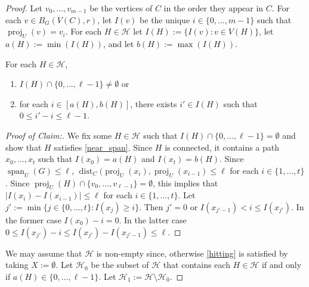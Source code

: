\documentclass{patmorin}
\newenvironment{clmproof}{\begin{proof}[Proof of Claim:]\renewcommand{\qedsymbol}{\rule{1ex}{1ex}}}{\end{proof}}
\DeclareMathOperator{\proj}{proj}
\DeclareMathOperator{\spn}{span}
\DeclareMathOperator{\dist}{dist}
\begin{document}
\begin{proof}
  Let $v_0,\ldots,v_{m-1}$ be the vertices of $C$ in the order they appear in $C$.  For each $v\in B_G(V(C),r)$, let $I(v)$ be the unique $i\in\{0,\ldots,m-1\}$ such that $\proj_U(v)=v_i$.  For each $H\in \mathcal{H}$ let $I(H):=\{I(v):v\in V(H)\}$, let  $a(H):=\min(I(H))$, and let $b(H):=\max(I(H))$.

  \begin{clm}\label{near_claim}
    For each $H\in\mathcal{H}$,
    \begin{enumerate}[nosep,nolistsep,label=\rm(\roman*),ref=\rm(\roman*)]
      \item $I(H)\cap\{0,\ldots,\ell-1\}\neq\emptyset$ or
      \item\label{near_span} for each $i\in [a(H),b(H)]$, there exists $i'\in I(H)$ such that $0\le i'-i\le\ell-1$.
    \end{enumerate}
  \end{clm}

  \begin{clmproof}
    We fix some $H\in\mathcal{H}$ such that $I(H)\cap\{0,\ldots,\ell-1\}=\emptyset$ and show that $H$ satisfies \ref{near_span}.  Since $H$ is connected, it contains a path $x_0,\ldots,x_t$ such that $I(x_0)=a(H)$ and $I(x_{t})=b(H)$. Since $\spn_U(G)\le\ell$, $\dist_C(\proj_U(x_i),\proj_U(x_{i-1})\le\ell$ for each $i\in\{1,\ldots,t\}$.  Since $\proj_U(H)\cap\{v_0,\ldots,v_{\ell-1}\}=\emptyset$, this implies that $|I(x_i)-I(x_{i-1})|\le\ell$ for each $i\in\{1,\ldots,t\}$. Let $j':=\min\{j\in\{0,\ldots,t\}:I(x_j)\ge i\}$.  Then $j'=0$ or $I(x_{j'-1})< i\le I(x_{j'})$. In the former case $I(x_0)-i=0$. In the latter case $0\le I(x_{j'})-i\le I(x_{j'})-I(x_{j'-1})\le\ell$.
  \end{clmproof}

  We may assume that $\mathcal{H}$ is non-empty since, otherwise \cref{hitting} is satisfied by taking $X:=\emptyset$.  Let $\mathcal{H}_0$ be the subset of $\mathcal{H}$ that contains each $H\in\mathcal{H}$ if and only if $a(H)\in\{0,\ldots,\ell-1\}$.  Let $\mathcal{H}_1:=\mathcal{H}\setminus\mathcal{H}_0$.


\end{proof}
\end{document}
